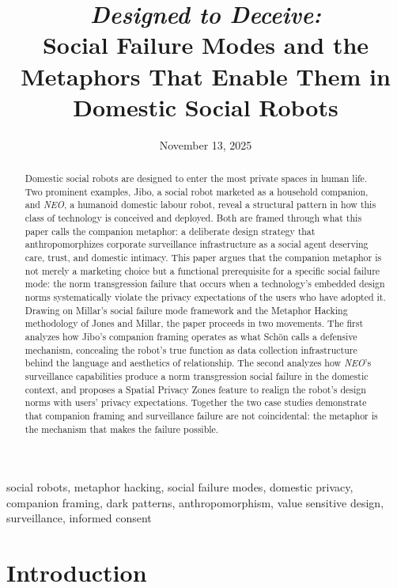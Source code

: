 \documentclass{ieee-portfolio}
\title{\textit{Designed to Deceive:}\\
Social Failure Modes and the Metaphors That Enable Them in Domestic Social Robots}
\date{November 13, 2025}
\author{
    \IEEEauthorblockN{Jaxen Anirban Dutta\,\orcidlink{0009-0002-5088-4679}}
    \IEEEauthorblockA{\textit{School of Engineering Design and Teaching Innovation} \\
    \textit{University of Ottawa, Ottawa, Ontario, Canada} \\
    adutt042@uottawa.ca}
}
\newcommand{\neo}{\textit{NEO}}
\begin{document}
\maketitle

\begin{abstract}
Domestic social robots are designed to enter the most private spaces in human life. Two prominent examples, Jibo, a social robot marketed as a household companion, and \neo{}, a humanoid domestic labour robot, reveal a structural pattern in how this class of technology is conceived and deployed. Both are framed through what this paper calls the companion metaphor: a deliberate design strategy that anthropomorphizes corporate surveillance infrastructure as a social agent deserving care, trust, and domestic intimacy. This paper argues that the companion metaphor is not merely a marketing choice but a functional prerequisite for a specific social failure mode: the norm transgression failure that occurs when a technology's embedded design norms systematically violate the privacy expectations of the users who have adopted it. Drawing on Millar's social failure mode framework and the Metaphor Hacking methodology of Jones and Millar, the paper proceeds in two movements. The first analyzes how Jibo's companion framing operates as what Sch\"{o}n calls a defensive mechanism, concealing the robot's true function as data collection infrastructure behind the language and aesthetics of relationship. The second analyzes how \neo{}'s surveillance capabilities produce a norm transgression social failure in the domestic context, and proposes a Spatial Privacy Zones feature to realign the robot's design norms with users' privacy expectations. Together the two case studies demonstrate that companion framing and surveillance failure are not coincidental: the metaphor is the mechanism that makes the failure possible.
\end{abstract}

\begin{IEEEkeywords}
social robots, metaphor hacking, social failure modes, domestic privacy, companion framing, dark patterns, anthropomorphism, value sensitive design, surveillance, informed consent
\end{IEEEkeywords}

\section{Introduction}
\end{document}
